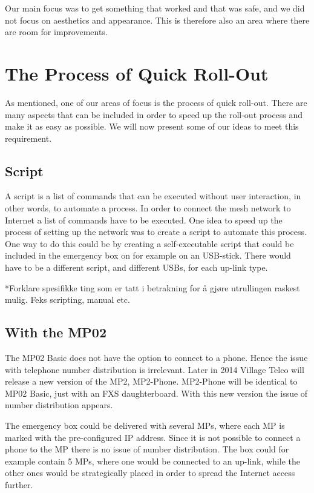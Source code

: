 Our main focus was to get something that worked and that was safe, and we did not focus on aesthetics and appearance. This is therefore also an area where there are room for improvements. 


\section{The Process of Quick Roll-Out}
As mentioned, one of our areas of focus is the process of quick roll-out. There are many aspects that can be included in order to speed up the roll-out process and make it as easy as possible. We will now present some of our ideas to meet this requirement.

\subsection{Script}
A script is a list of commands that can be executed without user interaction, in other words, to automate a process. In order to connect the mesh network to Internet a list of commands have to be executed. One idea to speed up the process of setting up the network was to create a script to automate this process. One way to do this could be by creating a self-executable script that could be included in the emergency box on for example on an USB-stick. There would have to be a different script, and different USBs, for each up-link type. 

*Forklare spesifikke ting som er tatt i betrakning for å gjøre utrullingen raskest mulig. Feks scripting, manual etc. 



\subsection{With the MP02}
The MP02 Basic does not have the option to connect to a phone. Hence the issue with telephone number distribution is irrelevant. Later in 2014 Village Telco will release a new version of the MP2, MP2-Phone. MP2-Phone will be identical to MP02 Basic, just with an FXS daughterboard. With this new version the issue of number distribution appears. 

The emergency box could be delivered with several MPs, where each MP is marked with the pre-configured IP address. Since it is not possible to connect a phone to the MP there is no issue of number distribution. The box could for example contain 5 MPs, where one would be connected to an up-link, while the other ones would be strategically placed in order to spread the Internet access further. 


